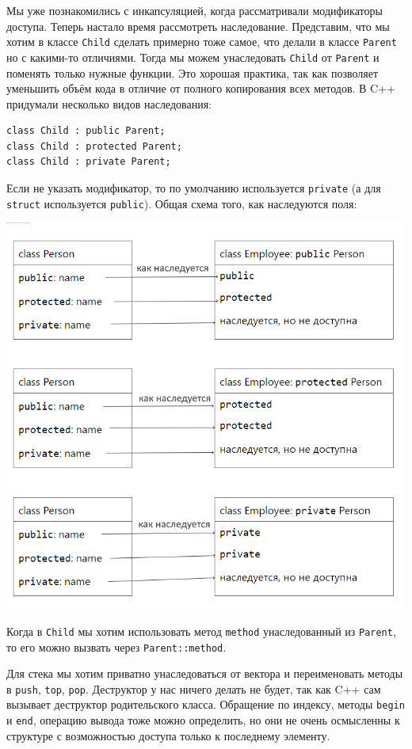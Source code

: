 Мы уже познакомились с инкапсуляцией, когда рассматривали модификаторы доступа. Теперь настало время рассмотреть наследование. Представим, что мы хотим в классе \texttt{Child} сделать примерно тоже самое, что делали в классе \texttt{Parent} но с какими-то отличиями. Тогда мы можем унаследовать \texttt{Child} от \texttt{Parent} и поменять только нужные функции. Это хорошая практика, так как позволяет уменьшить объём кода в отличие от полного копирования всех методов. В C++ придумали несколько видов наследования:
\begin{verbatim}
class Child : public Parent;
class Child : protected Parent;
class Child : private Parent;
\end{verbatim}
Если не указать модификатор, то по умолчанию используется \texttt{private} (а для \texttt{struct} используется \texttt{public}). Общая схема того, как наследуются поля:

\includegraphics[scale=0.4]{4-inheritance.png}

Когда в \texttt{Child} мы хотим использовать метод \texttt{method} унаследованный из \texttt{Parent}, то его можно вызвать через \texttt{Parent::method}.

Для стека мы хотим приватно унаследоваться от вектора и переименовать методы в \texttt{push}, \texttt{top}, \texttt{pop}. Деструктор у нас ничего делать не будет, так как C++ сам вызывает деструктор родительского класса. Обращение по индексу, методы \texttt{begin} и \texttt{end}, операцию вывода тоже можно определить, но они не очень осмысленны к структуре с возможностью доступа только к последнему элементу.

